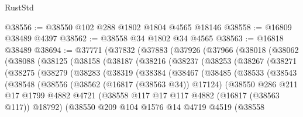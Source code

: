 \begin{lexlean}{RustStd}
\begin{coremodule}
{\begin{coremodule}
{{{{{{{{{{{{{{{{{{{{{{{{{{{{{{{{{{{{{{{{{{{{{{{{{{{{{{{@38556 := @38550 @102 @288 @1802 @1804 @4565 @18146
@38558 := @16809 @38489 @4397
@38562 := @38558 @34 @1802 @34 @4565
@38563 := @16818 @38489
@38694 := @37771
    (@37832
      (@37883
        (@37926
          (@37966
            (@38018
              (@38062
                (@38088
                  (@38125
                    (@38158
                      (@38187
                        (@38216
                          (@38237
                            (@38253
                              (@38267
                                (@38271
                                  (@38275
                                    (@38279
                                      (@38283
                                        (@38319
                                          (@38384
                                            (@38467
                                              (@38485
                                                (@38533
                                                  (@38543
                                                    (@38548
                                                      (@38556
                                                        (@38562 (@16817 (@38563 @34)) @17124)
                                                        (@38550
                                                          @286
                                                          @211
                                                          @17
                                                          @1799
                                                          @4882
                                                          @4721
                                                          (@38558
                                                            @117
                                                            @17
                                                            @117
                                                            @4882
                                                            (@16817 (@38563 @117))
                                                            @18792)
                                                          (@38550
                                                            @209
                                                            @104
                                                            @1576
                                                            @14
                                                            @4719
                                                            @4519
                                                            (@38558
}}}}}}}}}}}}}}}}}}}}}}}}}}}}}}}}}}}}}}}}}}}}}}}}}}}}}}}
\end{coremodule}}
\end{coremodule}
\end{lexlean}
